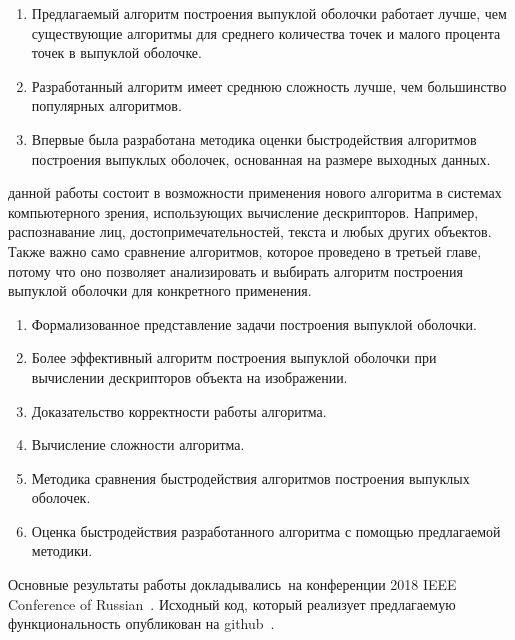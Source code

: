 {\novelty}
\begin{enumerate}
	\item Предлагаемый алгоритм построения выпуклой оболочки работает лучше, чем существующие алгоритмы для среднего количества точек и малого процента точек в выпуклой оболочке.
	\item Разработанный алгоритм имеет среднюю сложность лучше, чем большинство популярных алгоритмов.
	\item Впервые была разработана методика оценки быстродействия алгоритмов построения выпуклых оболочек, основанная на размере выходных данных.
\end{enumerate}

{\influence} данной работы состоит в возможности применения нового алгоритма в системах компьютерного зрения, использующих вычисление дескрипторов. Например, распознавание лиц, достопримечательностей, текста и любых других объектов. Также важно само сравнение алгоритмов, которое проведено в третьей главе, потому что оно позволяет анализировать и выбирать алгоритм построения выпуклой оболочки для конкретного применения.

{}
\begin{enumerate}
	\item Формализованное представление задачи построения выпуклой оболочки.
 	\item Более эффективный алгоритм построения выпуклой оболочки при вычислении дескрипторов объекта на изображении.
	\item Доказательство корректности работы алгоритма.
	\item Вычисление сложности алгоритма.
	\item Методика сравнения быстродействия алгоритмов построения выпуклых оболочек.
	\item Оценка быстродействия разработанного алгоритма с помощью предлагаемой методики.
\end{enumerate}

{\probation}
Основные результаты работы докладывались~на конференции 2018 IEEE Conference of Russian~\cite{matrokhin2018convex}. Исходный код, который реализует предлагаемую функциональность опубликован на github~\cite{matrokhin2017github}.
